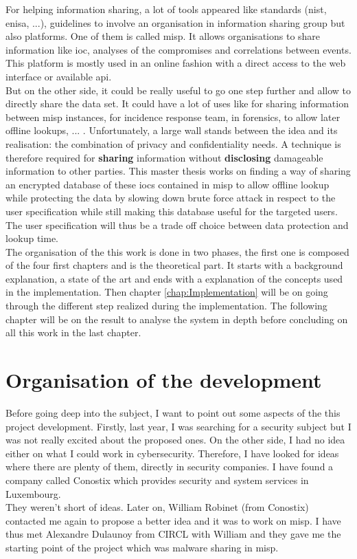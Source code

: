 \documentclass{eplmastersthesis}
\begin{document}
For helping information sharing, a lot of tools appeared like standards (\gls{nist}, \gls{enisa}, ...), guidelines to involve an organisation in information sharing group but also platforms. One of them is called \gls{misp}. It allows organisations to share information like \gls{ioc}, analyses of the compromises and correlations between events.\\
This platform is mostly used in an online fashion with a direct access to the web interface or available \gls{api}.\\
But on the other side, it could be really useful to go one step further and allow to directly share the data set. It could have a lot of uses like for sharing information between \gls{misp} instances, for incidence response team, in forensics, to allow later offline lookups, ... .
Unfortunately, a large wall stands between the idea and its realisation: the combination of privacy and confidentiality needs.
A technique is therefore required for \textbf{sharing} information without \textbf{disclosing} damageable information to other parties. This master thesis works on finding a way of sharing an encrypted database of these \gls{ioc}s contained in \gls{misp} to allow offline lookup while protecting the data by slowing down brute force attack in respect to the user specification while still making this database useful for the targeted users. The user specification will thus be a trade off choice between data protection and lookup time.\\

The organisation of the this work is done in two phases, the first one is composed of the four first chapters and is the theoretical part. It starts with a background explanation, a state of the art and ends with a explanation of the concepts used in the implementation. Then chapter \ref{chap:Implementation} will be on going through the different step realized during the implementation. The following chapter will be on the result to analyse the system in depth before concluding on all this work in the last chapter.

\section{Organisation of the development}
Before going deep into the subject, I want to point out some aspects of the this project development.
Firstly, last year, I was searching for a security subject but I was not really excited about the proposed ones. On the other side, I had no idea either on what I could work in cybersecurity. Therefore, I have looked for ideas where there are plenty of them, directly in security companies.
I have found a company called Conostix which provides security and system services in Luxembourg.\\
They weren't short of ideas. Later on, William Robinet (from Conostix) contacted me again to propose a better idea and it was to work on \gls{misp}. I have thus met Alexandre Dulaunoy from CIRCL with William and they gave me the starting point of the project which was malware sharing in \gls{misp}.\\
\end{document}
